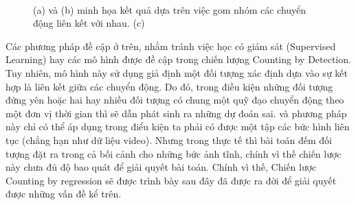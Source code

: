\begin{figure}%
\centering
{}\qquad
{}\\
%
\caption{(a) và (b) minh họa kết quả dựa trên việc gom nhóm các chuyển động liên kết với nhau. (c)  }
\label{3figs}
\end{figure}

	Các phương pháp \cite{Rabaud2006CountingCM, brostow2006unsupervised} đề cập ở trên, nhằm tránh việc học có giám sát (Supervised Learning) hay các mô hình được đề cập trong chiến lượng Counting by Detection. Tuy nhiên, mô hình này sử dụng giả định một đối tượng xác định dựa vào sự kết hợp là liên kết giữa các chuyển động. Do đó, trong điều kiện những đối tượng đứng yên hoặc hai hay nhiều đối tượng có chung một quỹ đạo chuyển động theo một đơn vị thời gian thì sẽ dẫn phát sinh ra những dự đoán sai. và phương pháp này chỉ có thể áp dụng trong điểu kiện ta phải có được một tập các bức hình liên tục (chẳng hạn như dữ liệu video). Nhưng trong thực tế thì bài toán đếm đối tượng đặt ra trong cả bối cảnh cho những bức ảnh tĩnh, chính vì thế chiến lược này chưa đủ độ bao quát để giải quyết bài toán. Chính vì thế, Chiến lược Counting by regression sẽ được trình bày sau đây đã được ra đời để giải quyết được những vấn đề kể trên.  
